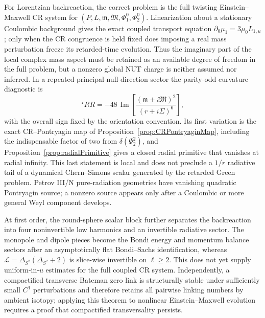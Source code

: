 \documentclass[aps,prd,reprint,nofootinbib,superscriptaddress]{revtex4-2}
\theoremstyle{definition}
\theoremstyle{remark}
\begin{document}
For Lorentzian backreaction, the correct problem is the full twisting Einstein--Maxwell CR system for $(P,L,\mathfrak m,\mathfrak M,\Phi_1^0,\Phi_2^0)$. Linearization about a stationary Coulombic background gives the exact coupled transport equation $\partial_0\mu_1=3\mu_0L_{1,u}$; only when the CR congruence is held fixed does imposing a real mass perturbation freeze its retarded-time evolution. Thus the imaginary part of the local complex mass aspect must be retained as an available degree of freedom in the full problem, but a nonzero global NUT charge is neither assumed nor inferred. In a repeated-principal-null-direction sector the parity-odd curvature diagnostic is
\begin{equation}
 {}^{\star}RR
 =-48\,\operatorname{Im}\!\left[
 \frac{(\mathfrak m+i\mathfrak M)^2}{(r+i\Sigma)^6}
 \right],
 \label{eq:ConclusionPontryagin}
\end{equation}
with the overall sign fixed by the orientation convention. Its first variation is the exact CR--Pontryagin map of Proposition~\ref{prop:CRPontryaginMap}, including the indispensable factor of two from $\delta(\Psi_2^2)$, and Proposition~\ref{prop:radialPrimitive} gives a closed radial primitive that vanishes at radial infinity. This last statement is local and does not preclude a $1/r$ radiative tail of a dynamical Chern--Simons scalar generated by the retarded Green problem. Petrov III/N pure-radiation geometries have vanishing quadratic Pontryagin source; a nonzero source appears only after a Coulombic or more general Weyl component develops.

At first order, the round-sphere scalar block further separates the backreaction into four noninvertible low harmonics and an invertible radiative sector. The monopole and dipole pieces become the Bondi energy and momentum balance sectors after an asymptotically flat Bondi--Sachs identification, whereas $\mathcal L=\Delta_{S^2}(\Delta_{S^2}+2)$ is slice-wise invertible on $\ell\ge2$. This does not yet supply uniform-in-$u$ estimates for the full coupled CR system. Independently, a compactified transverse Bateman zero link is structurally stable under sufficiently small $C^1$ perturbations and therefore retains all pairwise linking numbers by ambient isotopy; applying this theorem to nonlinear Einstein--Maxwell evolution requires a proof that compactified transversality persists.
\end{document}
